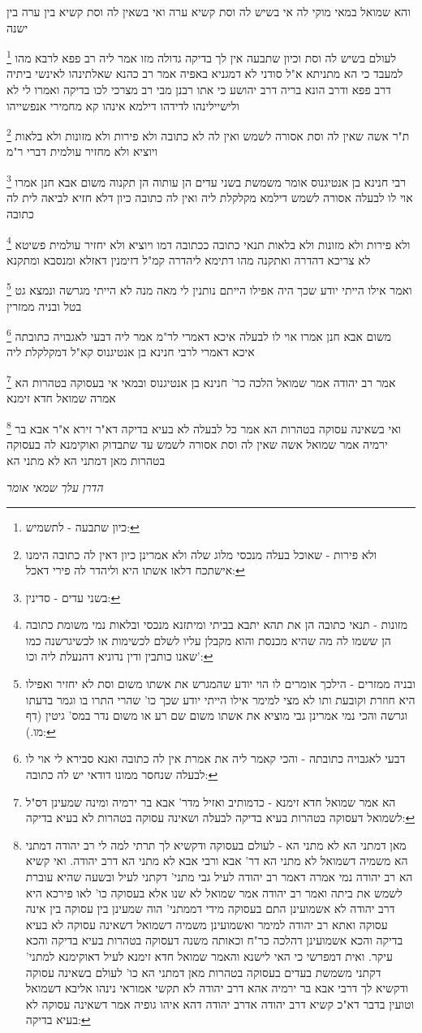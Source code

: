\documentclass[12pt, openany]{book}
\newcommand{\footnotecomment}[1]{
	\renewcommand\thefootnote{}
	\footnote{#1}}
\newcommand{\commenta}[1]{\footnotecomment{#1}}
\begin{document}
{והא שמואל במאי מוקי לה אי בשיש לה וסת קשיא ערה ואי בשאין לה וסת קשיא בין ערה בין ישנה 
\commenta{כיון שתבעה - לתשמיש:}
לעולם בשיש לה וסת וכיון שתבעה אין לך בדיקה גדולה מזו אמר ליה רב פפא לרבא מהו למעבד כי הא מתניתא
א"ל סודני לא דמגניא באפיה אמר רב כהנא שאלתינהו לאינשי ביתיה דרב פפא ודרב הונא בריה דרב יהושע כי אתו רבנן מבי רב מצרכי לכו בדיקה ואמרו לי לא ולישיילינהו לדידהו דילמא אינהו קא מחמירי אנפשייהו 
\commenta{ולא פירות - שאוכל בעלה מנכסי מלוג שלה ולא אמרינן כיון דאין לה כתובה הימנו אישתכח דלאו אשתו היא וליהדר לה פירי דאכל:}
ת"ר אשה שאין לה וסת אסורה לשמש ואין לה לא כתובה ולא פירות ולא מזונות ולא בלאות ויוציא ולא מחזיר עולמית דברי ר"מ 
\commenta{בשני עדים - סדינין:}
רבי חנינא בן אנטיגנוס אומר משמשת בשני עדים הן עותוה הן תקנוה משום אבא חנן אמרו אוי לו לבעלה 
אסורה לשמש דילמא מקלקלת ליה ואין לה כתובה כיון דלא חזיא לביאה לית לה כתובה
\commenta{מזונות - תנאי כתובה הן את תהא יתבא בביתי ומיתזנא מנכסי ובלאות נמי משומת כתובה הן ששמו לה מה שהיא מכנסת והוא מקבלן עליו לשלם לכשימות או לכשיגרשנה כמו שאנו כותבין ודין נדוניא דהנעלת ליה וכו':}
ולא פירות ולא מזונות ולא בלאות תנאי כתובה ככתובה דמו 
ויוציא ולא יחזיר עולמית פשיטא לא צריכא דהדרה ואתקנה מהו דתימא ליהדרה קמ"ל דזימנין דאזלא ומנסבא ומתקנא
\commenta{ובניה ממזרים - הילכך אומרים לו הוי יודע שהמגרש את אשתו משום וסת לא יחזיר ואפילו היא חוזרת וקובעת ותו לא מצי למימר אילו הייתי יודע שכך כו' שהרי התרו בו וגמר בדעתו וגרשה והכי נמי אמרינן גבי מוציא את אשתו משום שם רע או משום נדר במס' גיטין (דף מו.):}
ואמר אילו הייתי יודע שכך היה אפילו הייתם נותנין לי מאה מנה לא הייתי מגרשה ונמצא גט בטל ובניה ממזרין 
\commenta{דבעי לאגבויה כתובתה - והכי קאמר ליה את אמרת אין לה כתובה ואנא סבירא לי אוי לו לבעלה שנחסר ממונו דודאי יש לה כתובה:}
משום אבא חנן אמרו אוי לו לבעלה איכא דאמרי לר"מ אמר ליה דבעי לאגבויה כתובתה איכא דאמרי לרבי חנינא בן אנטיגנוס קא"ל דמקלקלת ליה 
\commenta{הא אמר שמואל חדא זימנא - כדמותיב ואזיל מדר' אבא בר ירמיה ומינה שמעינן דס"ל לשמואל דעסוקה בטהרות בעיא בדיקה לבעלה ושאינה עסוקה בטהרות לא בעיא בדיקה:}
אמר רב יהודה אמר שמואל הלכה כר' חנינא בן אנטיגנוס ובמאי אי בעסוקה בטהרות הא אמרה שמואל חדא זימנא 
\commenta{מאן דמתני הא לא מתני הא - לעולם בעסוקה ודקשיא לך תרתי למה לי רב יהודה דמתני הא משמיה דשמואל לא מתני הא דר' אבא ורבי אבא לא מתני הא דרב יהודה. ואי קשיא הא רב יהודה נמי אמרה דאמר רב יהודה לעיל גבי מתני' דקתני לעיל ובשעה שהיא עוברת לשמש את ביתה ואמר רב יהודה אמר שמואל לא שנו אלא בעסוקה כו' לאו פירכא היא דרב יהודה לא אשמועינן התם בעסוקה מידי דממתני' הוה שמעינן בין עסוקה בין אינה עסוקה ואתא רב יהודה למימר ואשמועינן משמיה דשמואל דשאינה עסוקה לא בעיא בדיקה והכא אשמועינן דהלכה כר"ח וכאותה משנה דעסוקה בטהרות בעיא בדיקה והכא עיקר. ואית דמפרשי כי האי לישנא והאמר שמואל חדא זימנא לעיל דאוקימנא למתני' דקתני משמשת בעדים בעסוקה בטהרות מאן דמתני הא כו' לעולם בשאינה עסוקה ודקשיא לך דרבי אבא בר ירמיה אהא דרב יהודה לא תקשי אמוראי נינהו אליבא דשמואל וטועין בדבר דא"כ קשיא דרב יהודה אדרב יהודה דהא איהו גופיה אמר דשאינה עסוקה לא בעיא בדיקה: }
ואי בשאינה עסוקה בטהרות הא אמר כל לבעלה לא בעיא בדיקה דא"ר זירא א"ר אבא בר ירמיה אמר שמואל אשה שאין לה וסת אסורה לשמש עד שתבדוק ואוקימנא לה בעסוקה בטהרות מאן דמתני הא לא מתני הא
\par \par {\large\emph{הדרן עלך שמאי אומר}}\par \par }
\end{document}
